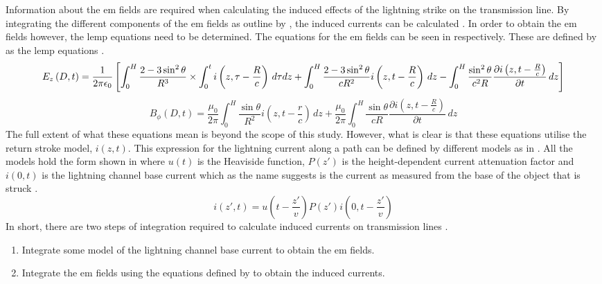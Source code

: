 Information about the \gls{em} fields are required when calculating the induced effects of the lightning strike on the transmission line. By integrating the different components of the \gls{em} fields as outline by \citeauthor{Agrawal1980}, the induced currents can be calculated \cite{Agrawal1980}. In order to obtain the \gls{em} fields however, the \gls{lemp} equations need to be determined. The equations for the \gls{em} fields can be seen in  respectively. These are defined by \citeauthor{Uman1975} as the \gls{lemp} equations \cite{Uman1975}.
\begin{dmath}
    E_z \left( D,t \right)=\frac{1}{2\pi\epsilon_0}\left[\int_{0}^{H}\frac{2 - 3\sin^{2}{\theta}}{R^3} \times \int_{0}^{t} i \left( z, \tau - \frac{R}{c} \right) \, d\tau dz \\ + \int_{0}^{H} \frac{2 - 3\sin^{2}{\theta}}{c R^2} i \left( z, t - \frac{R}{c} \right) \, dz - \int_{0}^{H} \frac{\sin^{2}{\theta}}{c^2 R} \frac{\partial i\left ( z, t - \frac{R}{c} \right )}{\partial t} \, dz \right ]
    \label{eqn:e_field}
\end{dmath}
\begin{dmath}
    B_{\phi} \left( D,t \right) = \frac{\mu_0}{2\pi} \int_{0}^{H} \frac{\sin{\theta}}{R^2} i \left ( z, t - \frac{r}{c} \right ) \, dz + \frac{\mu_0}{2\pi} \int_{0}^{H} \frac{\sin{\theta}}{cR} \frac{\partial i \left ( z, t - \frac{R}{c} \right )}{\partial t} \, dz
    \label{eqn:b_field}
\end{dmath}
The full extent of what these equations mean is beyond the scope of this study. However, what is clear is that these equations utilise the return stroke model, $i \left( z, t \right)$. This expression for the lightning current along a path can be defined by different models as in \cite{Paolone2009,ZhangFeizhouandLiuShanghe2002,Nucci2003}. All the models hold the form shown in  where $u(t)$ is the Heaviside function, $P(z')$ is the height-dependent current attenuation factor and $i(0,t)$ is the lightning channel base current which as the name suggests is the current as measured from the base of the object that is struck \cite{Paolone2009,ZhangFeizhouandLiuShanghe2002,Javor2011}.
\begin{equation}
    i(z',t)=u\left( t - \frac{z'}{v}\right) P \left( z' \right) i \left( 0,t - \frac{z'}{v} \right)
    \label{eqn:rsm}
\end{equation}
In short, there are two steps of integration required to calculate induced currents on transmission lines \cite{Nucci2010,Nucci2003,Paolone2009}.
\begin{enumerate}
    \item Integrate some model of the lightning channel base current to obtain the \gls{em} fields.
    \item Integrate the \gls{em} fields using the equations defined by \citeauthor{Agrawal1980} to obtain the induced currents.
\end{enumerate}


